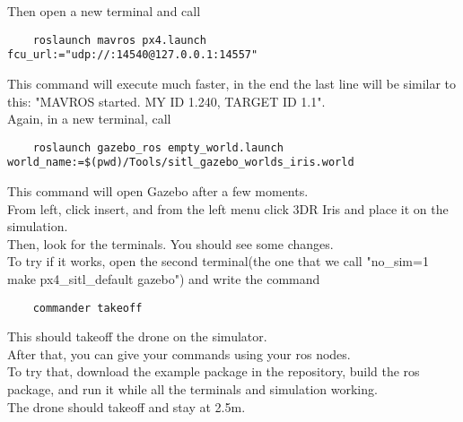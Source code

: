 \documentclass{article}
\begin{document}
Then open a new terminal and call \\
\begin{verbatim}
    roslaunch mavros px4.launch fcu_url:="udp://:14540@127.0.0.1:14557"
\end{verbatim}
\noindent
This command will execute much faster, in the end the last line will be similar to this: "MAVROS started. MY ID 1.240, TARGET ID 1.1". \\
Again, in a new terminal, call \\
\begin{verbatim}
    roslaunch gazebo_ros empty_world.launch world_name:=$(pwd)/Tools/sitl_gazebo_worlds_iris.world
\end{verbatim}
\noindent
This command will open Gazebo after a few moments. \\
From left, click insert, and from the left menu click 3DR Iris and place it on the simulation. \\
Then, look for the terminals. You should see some changes. \\
To try if it works, open the second terminal(the one that we call "no\_sim=1 make px4\_sitl\_default gazebo") and write the command \\
\begin{verbatim}
    commander takeoff
\end{verbatim}
\noindent
This should takeoff the drone on the simulator. \\
After that, you can give your commands using your ros nodes. \\
To try that, download the example package in the repository, build the ros package, and run it while all the terminals and simulation working. \\
The drone should takeoff and stay at 2.5m. \\
\end{document}
